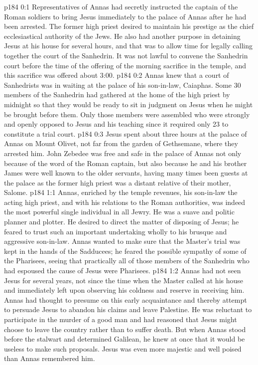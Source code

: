 \author{Midwayer Commission}
\vs p184 0:1 Representatives of Annas had secretly instructed the captain of the Roman soldiers to bring Jesus immediately to the palace of Annas after he had been arrested. The former high priest desired to maintain his prestige as the chief ecclesiastical authority of the Jews. He also had another purpose in detaining Jesus at his house for several hours, and that was to allow time for legally calling together the court of the Sanhedrin. It was not lawful to convene the Sanhedrin court before the time of the offering of the morning sacrifice in the temple, and this sacrifice was offered about 3:00.
\vs p184 0:2 Annas knew that a court of Sanhedrists was in waiting at the palace of his son\hyp{}in\hyp{}law, Caiaphas. Some 30 members of the Sanhedrin had gathered at the home of the high priest by midnight so that they would be ready to sit in judgment on Jesus when he might be brought before them. Only those members were assembled who were strongly and openly opposed to Jesus and his teaching since it required only 23 to constitute a trial court.
\vs p184 0:3 Jesus spent about three hours at the palace of Annas on Mount Olivet, not far from the garden of Gethsemane, where they arrested him. John Zebedee was free and safe in the palace of Annas not only because of the word of the Roman captain, but also because he and his brother James were well known to the older servants, having many times been guests at the palace as the former high priest was a distant relative of their mother, Salome.
\vs p184 1:1 Annas, enriched by the temple revenues, his son\hyp{}in\hyp{}law the acting high priest, and with his relations to the Roman authorities, was indeed the most powerful single individual in all Jewry. He was a suave and politic planner and plotter. He desired to direct the matter of disposing of Jesus; he feared to trust such an important undertaking wholly to his brusque and aggressive son\hyp{}in\hyp{}law. Annas wanted to make sure that the Master’s trial was kept in the hands of the Sadducees; he feared the possible sympathy of some of the Pharisees, seeing that practically all of those members of the Sanhedrin who had espoused the cause of Jesus were Pharisees.
\vs p184 1:2 Annas had not seen Jesus for several years, not since the time when the Master called at his house and immediately left upon observing his coldness and reserve in receiving him. Annas had thought to presume on this early acquaintance and thereby attempt to persuade Jesus to abandon his claims and leave Palestine. He was reluctant to participate in the murder of a good man and had reasoned that Jesus might choose to leave the country rather than to suffer death. But when Annas stood before the stalwart and determined Galilean, he knew at once that it would be useless to make such proposals. Jesus was even more majestic and well poised than Annas remembered him.
